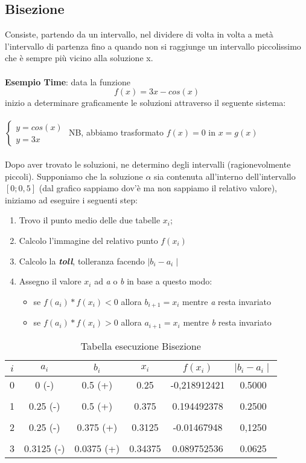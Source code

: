\subsection{Bisezione}
\label{Bisezione}
Consiste, partendo da un intervallo, nel dividere di volta in volta a metà l'intervallo di partenza fino a quando non si raggiunge un intervallo piccolissimo che è sempre più vicino alla soluzione x.
\\ \\
\textbf{Esempio Time}: data la funzione $$f(x)=3x - cos(x)$$ 
inizio a determinare graficamente le soluzioni attraverso il seguente sistema:
\\ \\
$\left\{
  \begin{array}{lr}
    y=cos(x) \\
    y=3x
  \end{array}
\right.$
NB, abbiamo trasformato $f(x)=0$ in $x=g(x)$
\\ \\
Dopo aver trovato le soluzioni, ne determino degli intervalli (ragionevolmente piccoli). Supponiamo che la soluzione $\alpha$ sia contenuta all'interno dell'intervallo $[0;0,5]$ (dal grafico sappiamo dov'è ma non sappiamo il relativo valore), iniziamo ad eseguire i seguenti step:
\begin{enumerate}
\item Trovo il punto medio delle due tabelle $x_i$;
\item Calcolo l'immagine del relativo punto $f(x_i)$
\item Calcolo la \textit{\textbf{toll}}, tolleranza facendo $\mid b_i-a_i\mid$
\item Assegno il valore $x_i$ ad \textit{a} o \textit{b} in base a questo modo:
\begin{itemize}
\item se $f(a_i) * f(x_i) < 0$ allora $b_{i+1} = x_i$ mentre \textit{a} resta invariato  
\item se  $f(a_i) * f(x_i) > 0$ allora $a_{i+1} = x_i$ mentre \textit{b} resta invariato  
\end{itemize}
\end{enumerate}


\newpage
\begin{table}[!h]
\centering
\begin{tabular}{|c|c|c|c|c|c|}
$i$ & $a_i$ & $b_i$ & $x_i$ & $f(x_i)$ & $\mid b_i-a_i \mid$ \\ 
\hline
0 & 0 (-) & 0.5 (+) & 0.25  & -0,218912421 & 0.5000 \\
& & & & &\\
1 & 0.25 (-) & 0.5 (+) & 0.375  &  0.194492378 & 0.2500 \\
& & & & &\\
2 & 0.25 (-) & 0.375 (+) & 0.3125 & -0.01467948 & 0,1250 \\
& & & & & \\
3 & 0.3125 (-) & 0.0375 (+) & 0.34375 & 0.089752536 & 0.0625
\end{tabular}
\caption{Tabella esecuzione Bisezione}
\end{table}


